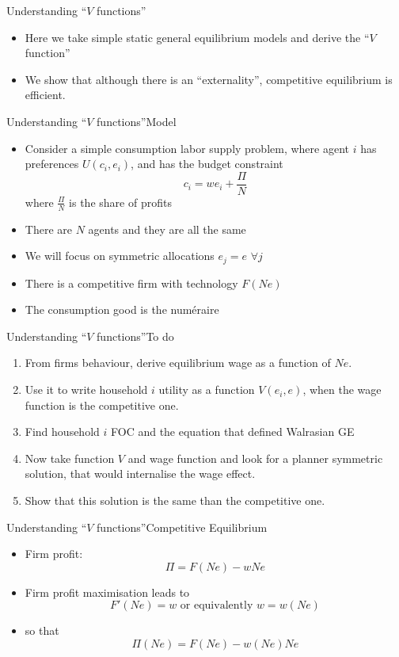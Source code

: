\documentclass[aspectratio=169,handout]{beamer}
\begin{document}
\begin{frame}{Understanding ``$V$ functions''}
\begin{itemize}
\item Here we take simple static general equilibrium models and derive the ``$V$ function''
\item We show that although there is an ``externality'', competitive equilibrium is efficient.
\end{itemize}
\end{frame}


\begin{frame}{Understanding ``$V$ functions''}{Model}
\begin{itemize}
\item Consider a simple consumption labor supply problem, where agent $i$ has preferences $U(c_{i},e_{i})$, and has the budget constraint 
$$
c_{i} = w e_{i} + \frac{\Pi}{N}
$$
 where $\frac{\Pi}{N}$ is the share of profits 
 \item There are $N$ agents and they are all the same
 \item We will focus on symmetric  allocations $e_{j} = e$ $\forall j$
\item There is a competitive firm with technology $F(N e)$
\item The consumption good is the num\'eraire
\end{itemize}
\end{frame}

\begin{frame}{Understanding ``$V$ functions''}{To do}
\begin{enumerate}
\item From firms behaviour, derive equilibrium wage as a function of $Ne$.
\item Use it to write household $i$ utility as a function $V(e_{i}, e)$, when the wage function is the competitive one. 
\item Find household $i$ FOC and the equation that defined Walrasian GE
\item Now take function $V$ and wage function and look for a planner symmetric solution, that would internalise the wage effect. 
\item Show that this solution is the same than the competitive one. 
\end{enumerate}
\end{frame}


\begin{frame}{Understanding ``$V$ functions''}{Competitive Equilibrium}

\begin{itemize}
\item Firm profit:
$$
\Pi = F(Ne) - w N e
$$

\item Firm profit maximisation leads to 
$$
F'(N e)=w \mbox{ or equivalently } w=w(N e)
$$

\item so that 
$$
\Pi(Ne) = F(Ne) - w(Ne) N e
$$

\end{itemize}
\end{frame}
\end{document}
